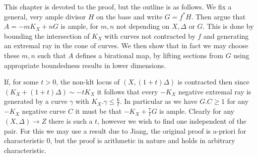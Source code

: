 \documentclass[a4paper,12pt]{book}
\begin{document}
This chapter is devoted to the proof, but the outline is as follows. We fix a general, very ample divisor $H$ on the base and write $G=f^{*}H$. Then argue that $A=-mK_{X}+nG$ is ample, for $m,n$ not depending on $X,\Delta$ or $G$. This is done by bounding the intersection of $K_{X}$ with curves not contracted by $f$ and generating an extremal ray in the cone of curves. We then show that in fact we may choose these $m,n$ such that $A$ defines a birational map, by lifting sections from $G$ using appropriate boundedness results in lower dimensions. 

If, for some $t>0$, the non-klt locus of $(X,(1+t)\Delta)$ is contracted then since $(K_{X}+(1+t)\Delta) \sim -tK_{X}$ it follows that every $-K_{X}$ negative extremal ray is generated by a curve $\gamma$ with $K_{X}.\gamma \leq \frac{6}{t}$. In particular as we have $G.C \geq 1$ for any $-K_{X}$ negative curve $C$ it must be that $-K_{X}+\frac{7}{t}G$ is ample. Clearly for any $(X,\Delta) \to Z$ there is such a $t$, however we wish to find one independent of the pair. For this we may use a result due to Jiang, the original proof is a-priori for characteristic $0$, but the proof is arithmetic in nature and holds in arbitrary characteristic.
\end{document}
